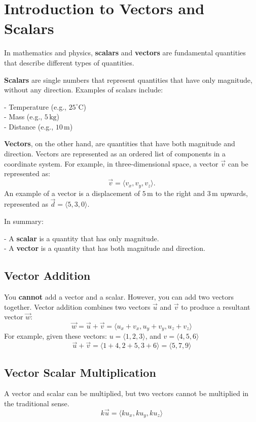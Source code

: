 \documentclass[a4paper,12pt,openany]{book}
\newcommand{\vcomponents}[4]{
    #1 = \langle #2, #3, #4 \rangle
}
\begin{document}
\section{Introduction to Vectors and Scalars}
In mathematics and physics, \textbf{scalars} and \textbf{vectors} are fundamental quantities that describe different types of quantities.

\textbf{Scalars} are single numbers that represent quantities that have only magnitude, without any direction. Examples of scalars include:

- Temperature (e.g., \(25^\circ \text{C}\))\\
- Mass (e.g., \(5 \, \text{kg}\))\\
- Distance (e.g., \(10 \, \text{m}\))

\textbf{Vectors}, on the other hand, are quantities that have both magnitude and direction. Vectors are represented as an ordered list of components in a coordinate system. For example, in three-dimensional space, a vector \(\vec{v}\) can be represented as:
\[
\vec{v} = \langle v_x, v_y, v_z \rangle.
\]
An example of a vector is a displacement of \(5 \, \text{m}\) to the right and \(3 \, \text{m}\) upwards, represented as \(\vec{d} = \langle 5, 3, 0 \rangle\).

In summary:

- A \textbf{scalar} is a quantity that has only magnitude.\\
- A \textbf{vector} is a quantity that has both magnitude and direction.

\subsection{Vector Addition}
You \textbf{cannot} add a vector and a scalar. However, you can add two vectors together. Vector addition combines two vectors \(\vec{u}\) and \(\vec{v}\) to produce a resultant vector \(\vec{w}\):
\[
    \vec{w} = \vec{u} + \vec{v} = \langle u_x + v_x, u_y + v_y, u_z + v_z \rangle
\]
For example, given these vectors: $\vcomponents{u}{1}{2}{3}$, and $\vcomponents{v}{4}{5}{6}$
\[
\vec{u} + \vec{v} = \langle 1 + 4, 2 + 5, 3 + 6 \rangle = \langle 5, 7, 9 \rangle
\]

\subsection{Vector Scalar Multiplication}
A vector and scalar can be multiplied, but two vectors cannot be multiplied in the traditional sense.
\[
    k\vec{u} = \langle ku_x, ku_y, ku_z \rangle
\]
\end{document}
